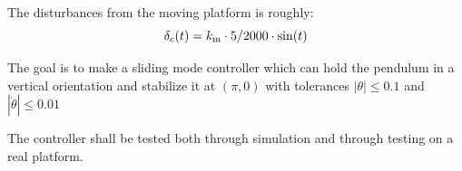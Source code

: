 The disturbances from the moving platform is roughly:
\begin{equation}
        \delta_c(t) = k_{\mathrm{m}} \cdot 5/2000 \cdot \sin(t)
\end{equation}

The goal is to make a sliding mode controller which can hold the pendulum in a vertical orientation and stabilize it at $(\pi,0)$ with tolerances $|\theta| \leq 0.1$ and $|\dot{\theta}| \leq 0.01$

The controller shall be tested both through simulation and through testing on a real platform.
